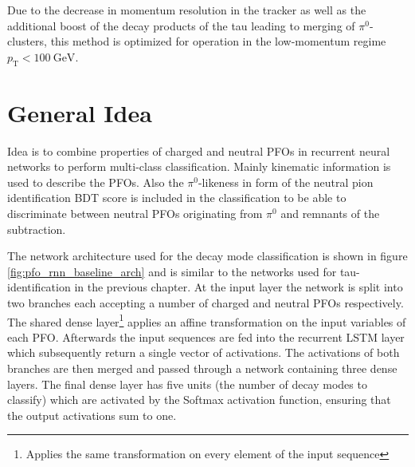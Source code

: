  Due to the decrease in momentum resolution in the
tracker as well as the additional boost of the decay products of the tau leading
to merging of $\pi^0$-clusters, this method is optimized for operation in the
low-momentum regime $p_\text{T} < \SI{100}{\giga\electronvolt}$.

\section{General Idea}
\label{sec:pfo_general}

Idea is to combine properties of charged and neutral PFOs in recurrent neural
networks to perform multi-class classification. Mainly kinematic information is
used to describe the PFOs. Also the $\pi^0$-likeness in form of the neutral pion
identification BDT score is included in the classification to be able to
discriminate between neutral PFOs originating from $\pi^0$ and remnants of the
subtraction.


The network architecture used for the decay mode classification is shown in
figure \ref{fig:pfo_rnn_baseline_arch} and is similar to the networks used for
tau-identification in the previous chapter. At the input layer the network is
split into two branches each accepting a number of charged and neutral PFOs
respectively. The shared dense layer\footnote{Applies the same transformation on
  every element of the input sequence} applies an affine transformation on the
input variables of each PFO. Afterwards the input sequences are fed into the
recurrent LSTM layer which subsequently return a single vector of activations.
The activations of both branches are then merged and passed through a network
containing three dense layers. The final dense layer has five units (the number
of decay modes to classify) which are activated by the Softmax activation
function, ensuring that the output activations sum to one.


